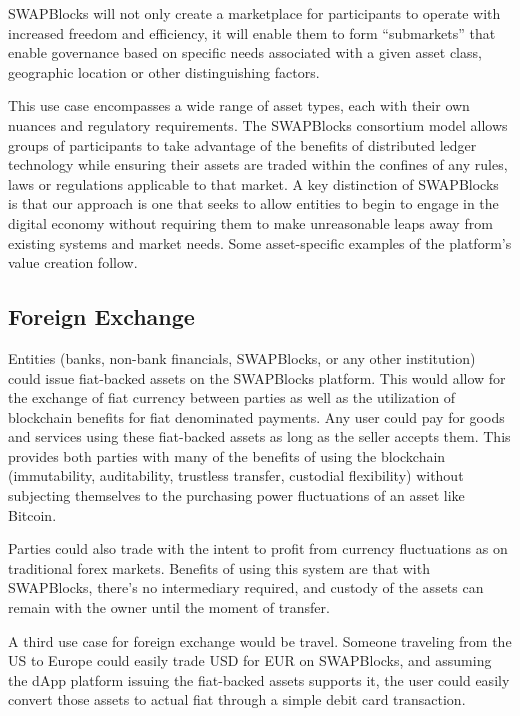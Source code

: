 \documentclass[12pt]{article}
\begin{document}
SWAPBlocks will not only create a marketplace for participants to operate with increased freedom and efficiency, 
it will enable them to form “submarkets” that enable governance based on specific needs associated with a given 
asset class, geographic location or other distinguishing factors.

This use case encompasses a wide range of asset types, each with their own nuances and regulatory requirements. 
The SWAPBlocks consortium model allows groups of participants to take advantage of the benefits of distributed 
ledger technology while ensuring their assets are traded within the confines of any rules, laws or regulations 
applicable to that market. A key distinction of SWAPBlocks is that our approach is one that seeks to allow entities 
to begin to engage in the digital economy without requiring them to make unreasonable leaps away from existing 
systems and market needs. Some asset-specific examples of the platform’s value creation follow.

\subsection{Foreign Exchange}

Entities (banks, non-bank financials, SWAPBlocks, or any other institution) could issue fiat-backed assets on 
the SWAPBlocks platform. This would allow for the exchange of fiat currency between parties as well as the utilization 
of blockchain benefits for fiat denominated payments. Any user could pay for goods and services using these fiat-backed 
assets as long as the seller accepts them. This provides both parties with many of the benefits of using the 
blockchain (immutability, auditability, trustless transfer, custodial flexibility) without subjecting themselves to 
the purchasing power fluctuations of an asset like Bitcoin.

Parties could also trade with the intent to profit from currency fluctuations as on traditional forex markets. Benefits of 
using this system are that with SWAPBlocks, there’s no intermediary required, and custody of the assets can remain 
with the owner until the moment of transfer.

A third use case for foreign exchange would be travel. Someone traveling from the US to Europe could easily trade 
USD for EUR on SWAPBlocks, and assuming the dApp platform issuing the fiat-backed assets supports it, the user 
could easily convert those assets to actual fiat through a simple debit card transaction.
\end{document}
